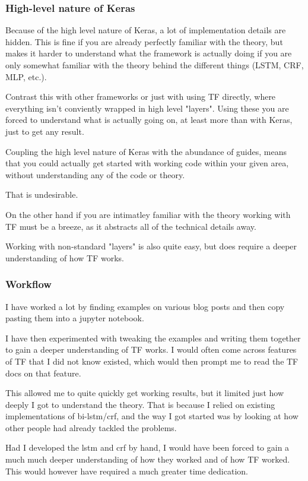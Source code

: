 \subsubsection{High-level nature of Keras}

Because of the high level nature of Keras, a lot of implementation details are hidden. This is fine if you are already perfectly familiar with the theory, but makes it harder to understand what the framework is actually doing if you are only somewhat familiar with the theory behind the different things  (LSTM, CRF, MLP, etc.).

Contrast this with other frameworks or just with using TF directly, where everything isn't conviently wrapped in high level "layers". Using these you are forced to understand what is actually going on, at least more than with Keras, just to get any result.

Coupling the high level nature of Keras with the abundance of guides, means that you could actually get started with working code within your given area, without understanding any of the code or theory.

That is undesirable.

On the other hand if you are intimatley familiar with the theory working with TF must be a breeze, as it abstracts all of the technical details away.

Working with non-standard "layers" is also quite easy, but does require a deeper understanding of how TF works.

\subsubsection{Workflow}

I have worked a lot by finding examples on various blog posts and then copy pasting them into a jupyter notebook.

I have then experimented with tweaking the examples and writing them together to gain a deeper understanding of TF works. I would often come across features of TF that I did not know existed, which would then prompt me to read the TF docs on that feature.

This allowed me to quite quickly get working results, but it limited just how deeply I got to understand the theory. That is because I relied on existing implementations of bi-lstm/crf, and the way I got started was by looking at how other people had already tackled the problems.

Had I developed the lstm and crf by hand, I would have been forced to gain a much much deeper understanding of how they worked and of how TF worked. This would however have required a much greater time dedication.

